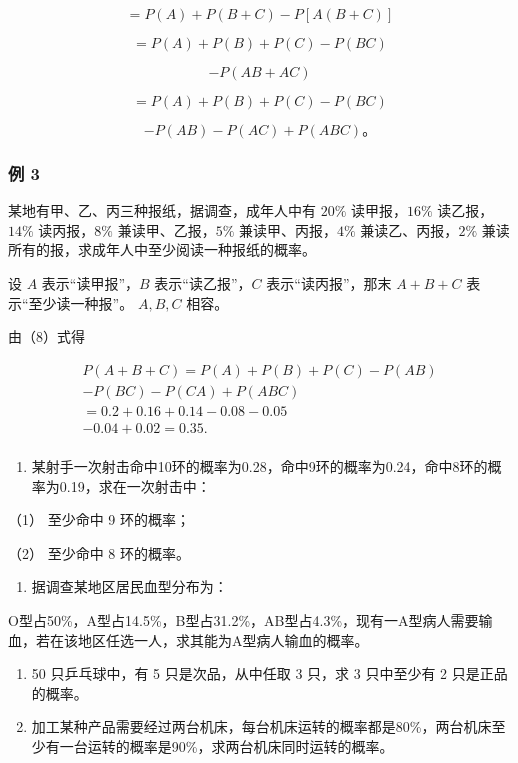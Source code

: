 \[
= P (A) + P (B + C) - P [ A (B + C) ]
\]

\[
= P (A) + P (B) + P (C) - P (B C)
\]

\[
- P (A B + A C)
\]

\[
= P (A) + P (B) + P (C) - P (B C)
\]

\[
- P (A B) - P (A C) + P (A B C)\text{。}
\]

\subsubsection{例 3}

某地有甲、乙、丙三种报纸，据调查，成年人中有 \(20\%\) 读甲报，\(16\%\)
读乙报，\(14\%\) 读丙报，\(8\%\) 兼读甲、乙报，\(5\%\)
兼读甲、丙报，\(4\%\) 兼读乙、丙报，\(2\%\)
兼读所有的报，求成年人中至少阅读一种报纸的概率。

 设 \(A\) 表示``读甲报''，\(B\) 表示``读乙报''，\(C\)
表示``读丙报''，那末 \(A + B + C\) 表示``至少读一种报''。 \(A, B, C\)
相容。

由（8）式得

\[
\begin{array}{l} P (A + B + C) = P (A) + P (B) + P (C) - P (A B) \\ - P (B C) - P (C A) + P (A B C) \\ = 0.2 + 0.16 + 0.14 - 0.08 - 0.05 \\ - 0.04 + 0.02 = 0.35. \\ \end{array}
\]

\begin{enumerate}
\item
  某射手一次射击命中10环的概率为0.28，命中9环的概率为0.24，命中8环的概率为0.19，求在一次射击中：
\end{enumerate}

（1） 至少命中 9 环的概率；

（2） 至少命中 8 环的概率。

\begin{enumerate}[start=2]
\item
  据调查某地区居民血型分布为：
\end{enumerate}

O型占50\%，A型占14.5\%，B型占31.2\%，AB型占4.3\%，现有一A型病人需要输血，若在该地区任选一人，求其能为A型病人输血的概率。

\begin{enumerate}[start=3]
\item
  50 只乒乓球中，有 5 只是次品，从中任取 3 只，求 3 只中至少有 2
  只是正品的概率。
\item
  加工某种产品需要经过两台机床，每台机床运转的概率都是80\%，两台机床至少有一台运转的概率是90\%，求两台机床同时运转的概率。
\end{enumerate}

